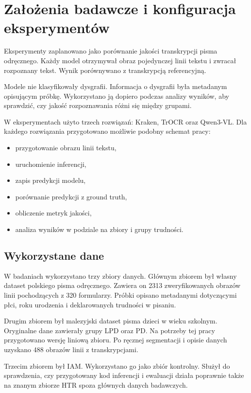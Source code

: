\section{Założenia badawcze i konfiguracja eksperymentów}
\label{sec:zalozenia-badawcze-i-konfiguracja-eksperymentow}

Eksperymenty zaplanowano jako porównanie jakości transkrypcji pisma odręcznego. Każdy model otrzymywał obraz pojedynczej linii tekstu i zwracał rozpoznany tekst. Wynik porównywano z transkrypcją referencyjną.

Modele nie klasyfikowały dysgrafii. Informacja o dysgrafii była metadanym opisującym próbkę. Wykorzystano ją dopiero podczas analizy wyników, aby sprawdzić, czy jakość rozpoznawania różni się między grupami.

W eksperymentach użyto trzech rozwiązań: Kraken, TrOCR oraz Qwen3-VL. Dla każdego rozwiązania przygotowano możliwie podobny schemat pracy:

\begin{itemize}
    \item przygotowanie obrazu linii tekstu,
    \item uruchomienie inferencji,
    \item zapis predykcji modelu,
    \item porównanie predykcji z ground truth,
    \item obliczenie metryk jakości,
    \item analiza wyników w podziale na zbiory i grupy trudności.
\end{itemize}

\subsection{Wykorzystane dane}
\label{subsec:wykorzystane-dane-eksperymenty}

W badaniach wykorzystano trzy zbiory danych. Głównym zbiorem był własny dataset polskiego pisma odręcznego. Zawiera on 2313 zweryfikowanych obrazów linii pochodzących z 320 formularzy. Próbki opisano metadanymi dotyczącymi płci, roku urodzenia i deklarowanych trudności w pisaniu.

Drugim zbiorem był malezyjski dataset pisma dzieci w wieku szkolnym. Oryginalne dane zawierały grupy LPD oraz PD. Na potrzeby tej pracy przygotowano wersję liniową zbioru. Po ręcznej segmentacji i opisie danych uzyskano 488 obrazów linii z transkrypcjami.

Trzecim zbiorem był IAM. Wykorzystano go jako zbiór kontrolny. Służył do sprawdzenia, czy przygotowany kod inferencji i ewaluacji działa poprawnie także na znanym zbiorze HTR spoza głównych danych badawczych.

